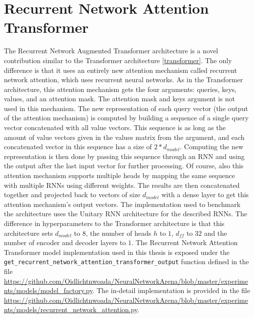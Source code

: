 \documentclass[draft,final]{vutinfth} %
\begin{document}
\section{Recurrent Network Attention Transformer} \label{rnatt}
The Recurrent Network Augmented Transformer architecture is a novel contribution similar to the Transformer architecture \ref{transformer}.
The only difference is that it uses an entirely new attention mechanism called recurrent network attention, which uses recurrent neural networks.
As in the Transformer architecture, this attention mechanism gets the four arguments: queries, keys, values, and an attention mask.
The attention mask and keys argument is not used in this mechanism.
The new representation of each query vector (the output of the attention mechanism) is computed by building a sequence of a single query vector concatenated with all value vectors.
This sequence is as long as the amount of value vectors given in the values matrix from the argument, and each concatenated vector in this sequence has a size of $2*d_{model}$.
Computing the new representation is then done by passing this sequence through an RNN and using the output after the last input vector for further processing.
Of course, also this attention mechanism supports multiple heads by mapping the same sequence with multiple RNNs using different weights.
The results are then concatenated together and projected back to vectors of size $d_{model}$ with a dense layer to get this attention mechanism's output vectors.
The implementation used to benchmark the architecture uses the Unitary RNN architecture for the described RNNs.
The difference in hyperparameters to the Transformer architecture is that this architecture sets $d_{model}$ to $8$, the number of heads $h$ to $1$, $d_{ff}$ to $32$ and the number of encoder and decoder layers to $1$.
The Recurrent Network Attention Transformer model implementation used in this thesis is exposed under the \texttt{get\_recurrent\_network\_attention\_transformer\_output} function defined in the file \url{https://github.com/Oidlichtnwoada/NeuralNetworkArena/blob/master/experiments/models/model_factory.py}.
The in-detail implementation is provided in the file \url{https://github.com/Oidlichtnwoada/NeuralNetworkArena/blob/master/experiments/models/recurrent_network_attention.py}.
\end{document}
